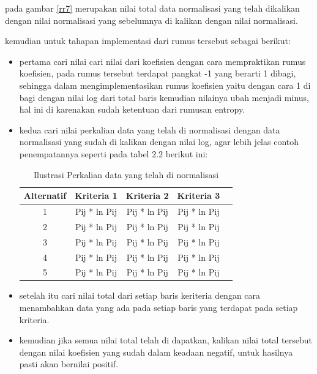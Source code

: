 \begin{enumerate}
\begin{itemize}
pada gambar \ref{rr7} merupakan nilai total data normalisasi yang telah dikalikan dengan nilai normalisasi yang sebelumnya di kalikan dengan nilai normalisasi.\par
\end{itemize}

kemudian untuk tahapan implementasi dari rumus tersebut sebagai berikut:

\begin{itemize}
\item pertama cari nilai cari nilai dari koefisien dengan cara mempraktikan rumus koefisien, pada rumus tersebut terdapat pangkat -1 yang berarti 1 dibagi, sehingga dalam mengimplementasikan rumus koefisien yaitu dengan cara 1 di bagi dengan nilai log dari total baris kemudian nilainya ubah menjadi minus, hal ini di karenakan sudah ketentuan dari rumusan entropy.

\item kedua cari nilai perkalian data yang telah di normalisasi dengan data normalisasi yang sudah di kalikan dengan nilai log, agar lebih jelas contoh penempatannya seperti pada tabel 2.2 berikut ini:

\begin{table}[h]
\caption{Ilustrasi Perkalian data yang telah di normalisasi}
\centering
\begin{tabular}{|c|c|c|c|c|}
\hline
Alternatif & Kriteria 1 & Kriteria 2 & Kriteria 3 \\
\hline
1   & Pij * ln Pij & Pij * ln Pij & Pij * ln Pij \\
\hline
2   & Pij * ln Pij  & Pij * ln Pij & Pij * ln Pij \\
\hline
3   & Pij * ln Pij  & Pij * ln Pij & Pij * ln Pij \\
\hline
4   & Pij * ln Pij  & Pij * ln Pij & Pij * ln Pij \\
\hline
5   & Pij * ln Pij  & Pij * ln Pij & Pij * ln Pij \\
\hline

\end{tabular}
\label{table2}
\end{table}

\item setelah itu cari nilai total dari setiap baris keriteria dengan cara menambahkan data yang ada pada setiap baris yang terdapat pada setiap kriteria.

\item kemudian jika semua nilai total telah di dapatkan, kalikan nilai total tersebut dengan nilai koefisien yang sudah dalam keadaan negatif, untuk hasilnya pasti akan bernilai positif.
\end{itemize}


\end{enumerate}
